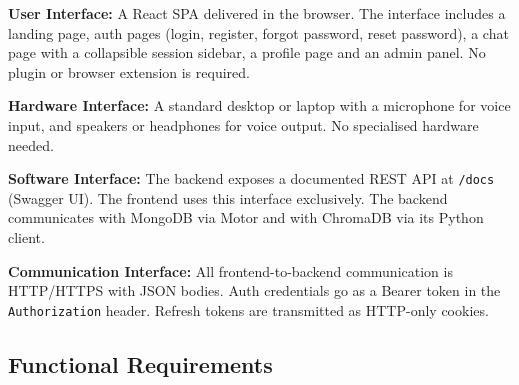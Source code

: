 \textbf{User Interface:}
A React SPA delivered in the browser. The interface includes a landing page, auth pages
(login, register, forgot password, reset password), a chat page with a collapsible session
sidebar, a profile page and an admin panel. No plugin or browser extension is required.

\textbf{Hardware Interface:}
A standard desktop or laptop with a microphone for voice input, and speakers or
headphones for voice output. No specialised hardware needed.

\textbf{Software Interface:}
The backend exposes a documented REST API at \texttt{/docs} (Swagger UI). The frontend
uses this interface exclusively. The backend communicates with MongoDB via Motor and with
ChromaDB via its Python client.

\textbf{Communication Interface:}
All frontend-to-backend communication is HTTP/HTTPS with JSON bodies. Auth credentials go
as a Bearer token in the \texttt{Authorization} header. Refresh tokens are transmitted as
HTTP-only cookies.

\subsection{Functional Requirements}

